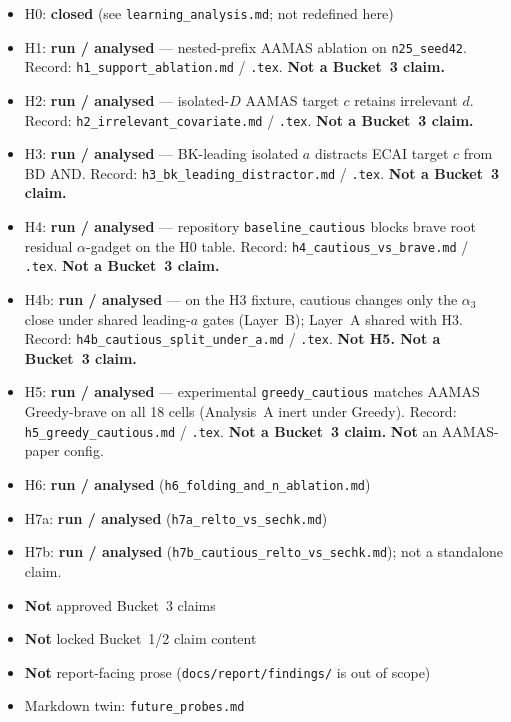 \documentclass[11pt]{article}
\begin{document}
\begin{itemize}
  \item H0: \textbf{closed} (see \texttt{learning\_analysis.md}; not redefined here)
  \item H1: \textbf{run / analysed} --- nested-prefix AAMAS ablation on
    \texttt{n25\_seed42}. Record: \texttt{h1\_support\_ablation.md} /
    \texttt{.tex}. \textbf{Not a Bucket~3 claim.}
  \item H2: \textbf{run / analysed} --- isolated-\(D\) AAMAS target \(c\) retains
    irrelevant \(d\). Record: \texttt{h2\_irrelevant\_covariate.md} /
    \texttt{.tex}. \textbf{Not a Bucket~3 claim.}
  \item H3: \textbf{run / analysed} --- BK-leading isolated \(a\) distracts
    ECAI target \(c\) from BD AND. Record:
    \texttt{h3\_bk\_leading\_distractor.md} / \texttt{.tex}.
    \textbf{Not a Bucket~3 claim.}
  \item H4: \textbf{run / analysed} --- repository
    \texttt{baseline\_cautious} blocks brave root residual $\alpha$-gadget
    on the H0 table. Record: \texttt{h4\_cautious\_vs\_brave.md} /
    \texttt{.tex}. \textbf{Not a Bucket~3 claim.}
  \item H4b: \textbf{run / analysed} --- on the H3 fixture, cautious changes
    only the $\alpha_3$ close under shared leading-$a$ gates (Layer~B);
    Layer~A shared with H3. Record: \texttt{h4b\_cautious\_split\_under\_a.md}
    / \texttt{.tex}. \textbf{Not H5. Not a Bucket~3 claim.}
  \item H5: \textbf{run / analysed} --- experimental
    \texttt{greedy\_cautious} matches AAMAS Greedy-brave on all 18 cells
    (Analysis~A inert under Greedy). Record: \texttt{h5\_greedy\_cautious.md}
    / \texttt{.tex}. \textbf{Not a Bucket~3 claim.} \textbf{Not} an
    AAMAS-paper config.
  \item H6: \textbf{run / analysed} (\texttt{h6\_folding\_and\_n\_ablation.md})
  \item H7a: \textbf{run / analysed} (\texttt{h7a\_relto\_vs\_sechk.md})
  \item H7b: \textbf{run / analysed} (\texttt{h7b\_cautious\_relto\_vs\_sechk.md}); not
    a standalone claim.
  \item \textbf{Not} approved Bucket~3 claims
  \item \textbf{Not} locked Bucket~1/2 claim content
  \item \textbf{Not} report-facing prose (\texttt{docs/report/findings/} is out of scope)
  \item Markdown twin: \texttt{future\_probes.md}
\end{itemize}
\end{document}
